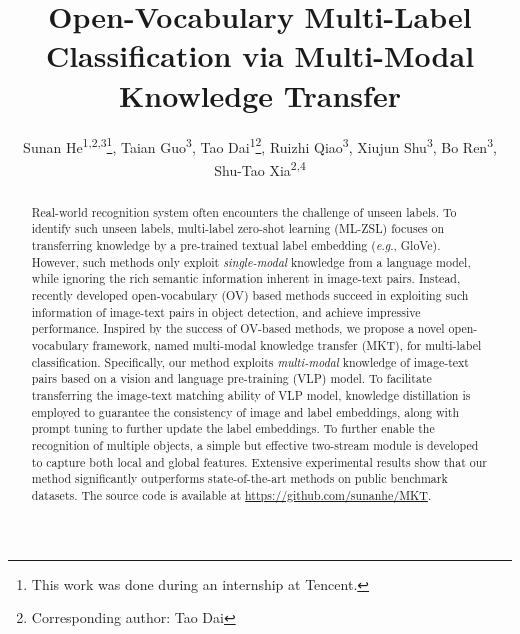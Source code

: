 \documentclass[letterpaper]{article} %
\title{Open-Vocabulary Multi-Label Classification via Multi-Modal Knowledge Transfer}
\author{
    Sunan He\textsuperscript{\rm 1,2,3}\equalcontrib\thanks{This work was done during an internship at Tencent.},
    Taian Guo\textsuperscript{\rm 3}\equalcontrib, 
    Tao Dai\textsuperscript{\rm 1}\thanks{Corresponding author: Tao Dai},
    Ruizhi Qiao\textsuperscript{\rm 3},
    Xiujun Shu\textsuperscript{\rm 3},
    Bo Ren\textsuperscript{\rm 3},
    Shu-Tao Xia\textsuperscript{\rm 2,4}
}
\newcommand{\eg}{\textit{e}.\textit{g}.}
\begin{document}
\maketitle

\begin{abstract}
Real-world recognition system often encounters the challenge of unseen labels.
To identify such unseen labels, multi-label zero-shot learning (ML-ZSL) focuses on transferring knowledge by a pre-trained textual label embedding (\eg, GloVe).
However, such methods only exploit \textit{single-modal} knowledge from a language model, while ignoring the rich semantic information inherent in image-text pairs.
Instead, recently developed open-vocabulary (OV) based methods  succeed in exploiting such information of image-text pairs  in  object detection, and achieve impressive performance.
Inspired by the success of OV-based methods, we propose a novel open-vocabulary framework, named multi-modal knowledge transfer (MKT), for  multi-label classification.
Specifically, our method exploits \textit{multi-modal} knowledge of image-text pairs  based on a vision and language pre-training (VLP) model.
To facilitate transferring the image-text matching ability of VLP model, knowledge distillation is employed to guarantee the consistency of image and label embeddings, along with prompt tuning to further update the label embeddings.
To further enable the recognition of multiple objects, a simple but effective two-stream module is developed to capture both local and global features.
Extensive experimental results show that our method significantly outperforms state-of-the-art methods on public benchmark datasets. 
The source code is available at \href{https://github.com/sunanhe/MKT}{https://github.com/sunanhe/MKT}.
\end{abstract}
\end{document}
